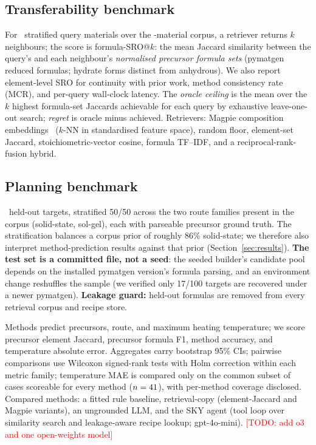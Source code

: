\documentclass[10pt]{article}
\newcommand{\todo}[1]{\textcolor{red}{[TODO: #1]}}
\begin{document}
\subsection{Transferability benchmark}
For \nRetrievalQueries\ stratified query materials over the
\corpusSize-material corpus, a retriever returns $k$ neighbours;
the score is formula-SRO@$k$: the mean Jaccard similarity between the
query's and each neighbour's \emph{normalised precursor formula sets}
(pymatgen reduced formulas; hydrate forms distinct from anhydrous). We
also report element-level SRO for continuity with prior work, method
consistency rate (MCR), and per-query wall-clock latency. The \emph{oracle
ceiling} is the mean over the $k$ highest formula-set Jaccards achievable
for each query by exhaustive leave-one-out search; \emph{regret} is oracle
minus achieved. Retrievers: Magpie composition
embeddings~\cite{ward2016magpie} ($k$-NN in standardised feature space),
random floor, element-set Jaccard, stoichiometric-vector cosine, formula
TF--IDF, and a reciprocal-rank-fusion hybrid.

\subsection{Planning benchmark}
\nPlanningCases\ held-out targets, stratified 50/50 across the two route
families present in the corpus (solid-state, sol-gel), each with parseable
precursor ground truth. The stratification balances a corpus prior of
roughly 86\% solid-state; we therefore also interpret method-prediction
results against that prior (Section~\ref{sec:results}). \textbf{The test
set is a committed file, not a seed}: the seeded builder's candidate pool
depends on the installed pymatgen version's formula parsing, and an
environment change reshuffles the sample (we verified only 17/100 targets
are recovered under a newer pymatgen). \textbf{Leakage guard:} held-out
formulas are removed from every retrieval corpus and recipe store.

Methods predict precursors, route, and maximum heating temperature; we
score precursor element Jaccard, precursor formula F1, method accuracy,
and temperature absolute error. Aggregates carry bootstrap 95\% CIs;
pairwise comparisons use Wilcoxon signed-rank tests with Holm correction
within each metric family; temperature MAE is compared only on the common
subset of cases scoreable for every method ($n=41$), with
per-method coverage disclosed. Compared methods: a fitted rule baseline,
retrieval-copy (element-Jaccard and Magpie variants), an ungrounded LLM,
and the SKY agent (tool loop over similarity search and leakage-aware
recipe lookup; gpt-4o-mini). \todo{add o3 and one open-weights model}
\end{document}
